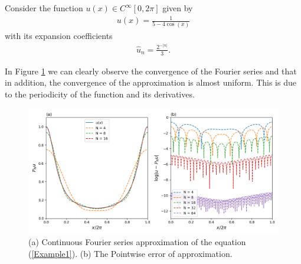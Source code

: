 	\begin{example}
	    Consider the function $u(x) \in C^{\infty} [0, 2 \pi]$ given by
    	\begin{align}
    		\label{Example1} 
    	    u(x) = \frac{1}{5 - 4 \cos(x)}   
    	\end{align}
    	with its expansion coefficients
    	\begin{align*}
    	     \hat{u}_{n} = \frac{2^{-|n|}}{3}.
    	\end{align*}
    
    	In Figure \ref{fig1} we can clearly observe the convergence of the Fourier series and that in addition, the convergence of the approximation is almost uniform. This is due to the periodicity of the function and its derivatives.
    	
    	\begin{figure}[H]
        \includegraphics[width=\textwidth]{preliminaries/figures/example21.png}
        \caption{(a) Continuous Fourier series approximation of the equation (\ref{Example1}). (b) The Pointwise error of approximation.}
        \label{fig1}
        \end{figure}
	\end{example} 
	
